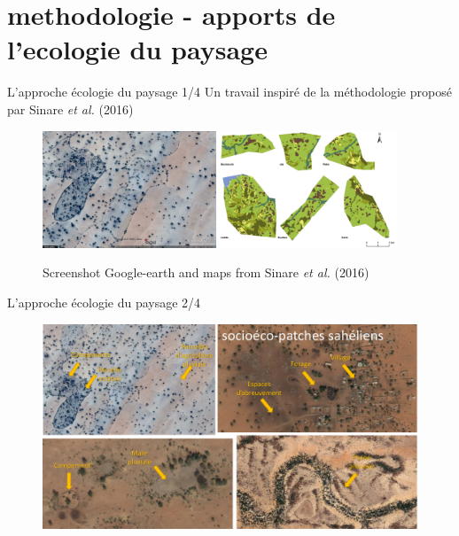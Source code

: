 \documentclass[newPxFont]{beamer}
\begin{document}
\section{methodologie - apports de l'ecologie du paysage}

\begin{frame}[c]{L'approche écologie du paysage 1/4}
\vspace{-1cm}
Un travail inspiré de la méthodologie proposé par Sinare \textit{et al.} (2016)
\begin{figure}
	\centering
	\includegraphics[height = 3.5cm]{img/ggearth}
  \includegraphics[height = 3.5cm]{img/Sinare_et_al2016}
  \caption{\small{Screenshot Google-earth and maps from Sinare \textit{et al.} (2016)}}
\end{figure}
\end{frame}

\begin{frame}[c]{L'approche écologie du paysage 2/4}
\vspace{-1cm}

\begin{figure}
  \hspace*{-0.5cm}
	\includegraphics[width = 12cm]{img/patches.png}
\end{figure}

\end{frame}
\end{document}
